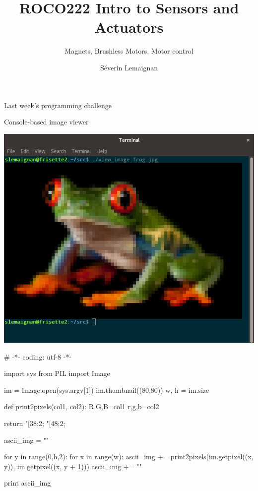 \documentclass[compress]{beamer}
\title{ROCO222 \newline Intro to Sensors and Actuators}
\subtitle{Magnets, Brushless Motors, Motor control}
\date{}
\author{Séverin Lemaignan}
\institute{Centre for Neural Systems and Robotics\\{\bf Plymouth University}}
\makeatletter
\def\beamer@writeslidentry@miniframesoff{%
  \expandafter\beamer@ifempty\expandafter{\beamer@framestartpage}{}%
  {%
    \clearpage\beamer@notesactions%
  }
}
\newcommand*{\miniframesoff}{\let\beamer@writeslidentry=\beamer@writeslidentry@miniframesoff}
\makeatother
\begin{document}

\maketitle

\miniframesoff

\begin{frame}[fragile]{Last week's programming challenge}

    \Large
    Console-based image viewer

        \begin{center}
            \includegraphics[width=0.7\linewidth]{../part3/figs/coding-challenge-terminal-image}
        \end{center}

\end{frame}


\begin{frame}
\begin{pythoncode}
# -*- coding: utf-8 -*-

import sys
from PIL import Image

im = Image.open(sys.argv[1])
im.thumbnail((80,80))
w, h = im.size

def print2pixels(col1, col2):
    R,G,B=col1
    r,g,b=col2

    return "[38;2;%
           "[48;2;%


ascii_img = ""

for y in range(0,h,2):
    for x in range(w):
        ascii_img += print2pixels(im.getpixel((x, y)),
                                  im.getpixel((x, y + 1)))
    ascii_img += "\n"

print ascii_img
\end{pythoncode}
\end{frame}
\end{document}
